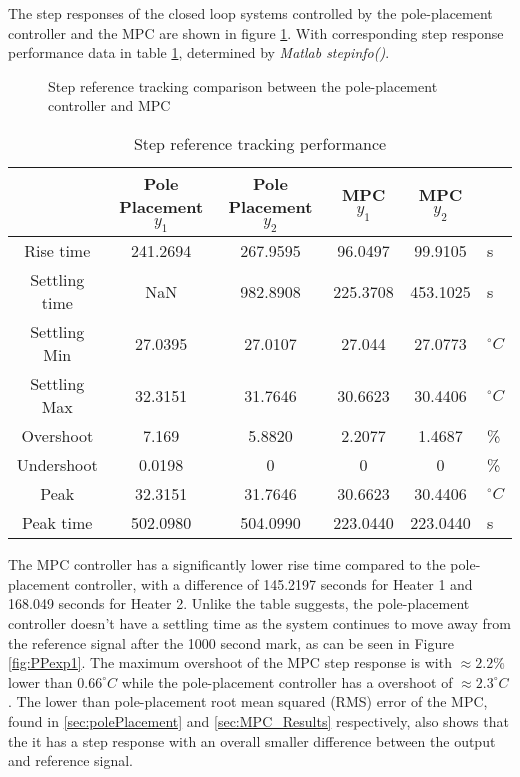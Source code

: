 The step responses of the closed loop systems controlled by the pole-placement controller and the MPC are shown in figure \ref{fig:compStepC}. With corresponding step response performance data in table \ref{tab:stepinfo}, determined by \textit{Matlab stepinfo()}.
\begin{figure}
    \centering
    
    \caption{Step reference tracking comparison between the pole-placement controller and MPC}
    \label{fig:compStepC}
\end{figure}
\begin{table}[h]
    \centering
    \caption{Step reference tracking performance}
    \begin{tabular}{c|c|c|c|c|l}
         & Pole Placement $y_1$ & Pole Placement $y_2$ & MPC $y_1$ & MPC $y_2$ &  \\
        \hline
        Rise time & 241.2694 & 267.9595 & 96.0497 & 99.9105 & s\\
        Settling time & NaN & 982.8908 & 225.3708 & 453.1025 & s\\
        Settling Min & 27.0395 & 27.0107 & 27.044 & 27.0773 & $^{\circ}C$\\
        Settling Max & 32.3151 & 31.7646 & 30.6623 & 30.4406 & $^{\circ}C$\\
        Overshoot & 7.169 & 5.8820 & 2.2077 & 1.4687 & \%\\
        Undershoot & 0.0198 & 0 & 0 & 0& \% \\
        Peak & 32.3151 & 31.7646 & 30.6623 & 30.4406 & $^{\circ}C$\\
        Peak time & 502.0980 & 504.0990 & 223.0440 & 223.0440 & s 
    \end{tabular}
    \label{tab:stepinfo}
\end{table}
The MPC controller has a significantly lower rise time compared to the pole-placement controller, with a difference of 145.2197 seconds for Heater 1 and 168.049 seconds for Heater 2. Unlike the table suggests, the pole-placement controller doesn't have a settling time as the system continues to move away from the reference signal after the 1000 second mark, as can be seen in Figure \ref{fig:PPexp1}. The maximum overshoot of the MPC step response is with $\approx 2.2\%$ lower than $0.66 ^{\circ}C$ while the pole-placement controller has a overshoot of $\approx 2.3 ^{\circ}C$. The lower than pole-placement root mean squared (RMS) error of the MPC, found in \ref{sec:polePlacement} and \ref{sec:MPC_Results} respectively, also shows that the it has a step response with an overall smaller difference between the output and reference signal.    

